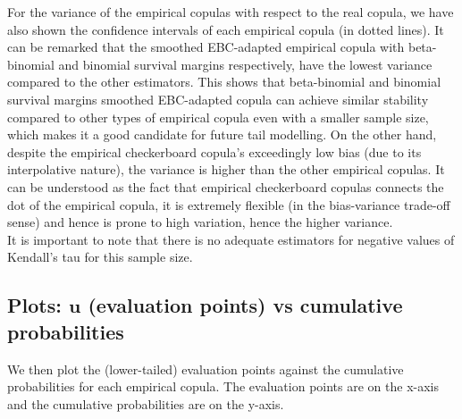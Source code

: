 \documentclass[12pt]{report}
\newcommand{\1}{\mathbf{1}}
\begin{document}
\begin{flushleft}
\vspace{0.5cm}
For the variance of the empirical copulas with respect to the real copula, we have also shown the confidence intervals of each empirical copula (in dotted lines). It can be remarked that the smoothed EBC-adapted empirical copula with beta-binomial and binomial survival margins respectively, have the lowest variance compared to the other estimators. This shows that beta-binomial and binomial survival margins smoothed EBC-adapted copula can achieve similar stability compared to other types of empirical copula even with a smaller sample size, which makes it a good candidate for future tail modelling. On the other hand, despite the empirical checkerboard copula's exceedingly low bias (due to its interpolative nature), the variance is higher than the other empirical copulas. It can be understood as the fact that empirical checkerboard copulas connects the dot of the empirical copula, it is extremely flexible (in the bias-variance trade-off sense) and hence is prone to high variation, hence the higher variance.\\
\vspace{0.5cm}
It is important to note that there is no adequate estimators for negative values of Kendall's tau for this sample size. \\

\newpage
\subsection{Plots: $\textbf{u}$ (evaluation points) vs cumulative probabilities}
\vspace{0.5cm}
We then plot the (lower-tailed) evaluation points against the cumulative probabilities for each empirical copula. The evaluation points are on the x-axis and the cumulative probabilities are on the y-axis.


\end{flushleft}
\end{document}
